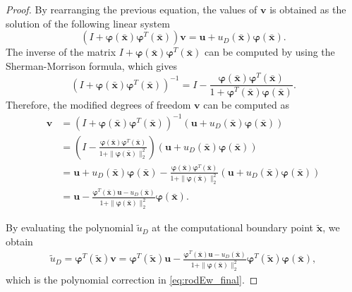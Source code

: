 \documentclass{article}
\renewcommand{\phi}{\varphi}
\begin{document}
\begin{proof}
    By rearranging the previous equation, the values of $\boldsymbol{v}$ is obtained as the solution of the following linear system
\begin{equation}
    (I + \boldsymbol{\phi}(\bar{\boldsymbol{x}}) \boldsymbol{\phi}^T(\bar{\boldsymbol{x}})) \boldsymbol{v} = \boldsymbol{u} + u_D(\bar{\boldsymbol{x}}) \boldsymbol{\phi}(\bar{\boldsymbol{x}}).
\end{equation}
The inverse of the matrix $I + \boldsymbol{\phi}(\bar{\boldsymbol{x}}) \boldsymbol{\phi}^T(\bar{\boldsymbol{x}})$ can be computed by using the Sherman-Morrison formula, which gives
\begin{equation}
    (I + \boldsymbol{\phi}(\bar{\boldsymbol{x}}) \boldsymbol{\phi}^T(\bar{\boldsymbol{x}}))^{-1} = I - \frac{\boldsymbol{\phi}(\bar{\boldsymbol{x}}) \boldsymbol{\phi}^T(\bar{\boldsymbol{x}})}{1 + \boldsymbol{\phi}^T(\bar{\boldsymbol{x}}) \boldsymbol{\phi}(\bar{\boldsymbol{x}})}.
\end{equation}
Therefore, the modified degrees of freedom $\boldsymbol{v}$ can be computed as
\begin{equation}
    \begin{split}
    \boldsymbol{v} &= (I + \boldsymbol{\phi}(\bar{\boldsymbol{x}}) \boldsymbol{\phi}^T(\bar{\boldsymbol{x}}))^{-1} (\boldsymbol{u} + u_D(\bar{\boldsymbol{x}}) \boldsymbol{\phi}(\bar{\boldsymbol{x}})) \\
    &= \left( I - \frac{\boldsymbol{\phi}(\bar{\boldsymbol{x}}) \boldsymbol{\phi}^T(\bar{\boldsymbol{x}})}{1 + \|\boldsymbol{\phi}(\bar{\boldsymbol{x}})\|^2_2} \right) (\boldsymbol{u} + u_D(\bar{\boldsymbol{x}}) \boldsymbol{\phi}(\bar{\boldsymbol{x}})) \\
    &= \boldsymbol{u} + u_D(\bar{\boldsymbol{x}}) \boldsymbol{\phi}(\bar{\boldsymbol{x}}) - \frac{\boldsymbol{\phi}(\bar{\boldsymbol{x}}) \boldsymbol{\phi}^T(\bar{\boldsymbol{x}})}{1 + \|\boldsymbol{\phi}(\bar{\boldsymbol{x}})\|^2_2} (\boldsymbol{u} + u_D(\bar{\boldsymbol{x}}) \boldsymbol{\phi}(\bar{\boldsymbol{x}})) \\
    &= \boldsymbol{u} - \frac{\boldsymbol{\phi}^T(\bar{\boldsymbol{x}})\boldsymbol{u} - u_D(\bar{\boldsymbol{x}})}{1 + \|\boldsymbol{\phi}(\bar{\boldsymbol{x}})\|^2_2} \boldsymbol{\phi}(\bar{\boldsymbol{x}}) .
    \end{split}
\end{equation}

By evaluating the polynomial $\tilde u_D$ at the computational boundary point $\tilde{\boldsymbol{x}}$, we obtain
\begin{equation}
    \begin{split}
    \tilde u_D = \boldsymbol{\phi}^T(\tilde{\boldsymbol{x}}) \boldsymbol{v} = \boldsymbol{\phi}^T(\tilde{\boldsymbol{x}}) \boldsymbol{u} - \frac{\boldsymbol{\phi}^T(\bar{\boldsymbol{x}})\boldsymbol{u} - u_D(\bar{\boldsymbol{x}})}{1 + \|\boldsymbol{\phi}(\bar{\boldsymbol{x}})\|^2_2} \boldsymbol{\phi}^T(\tilde{\boldsymbol{x}}) \boldsymbol{\phi}(\bar{\boldsymbol{x}}) , 
    \end{split}
\end{equation}
which is the polynomial correction in \eqref{eq:rodEw_final}.
\end{proof}
\end{document}

